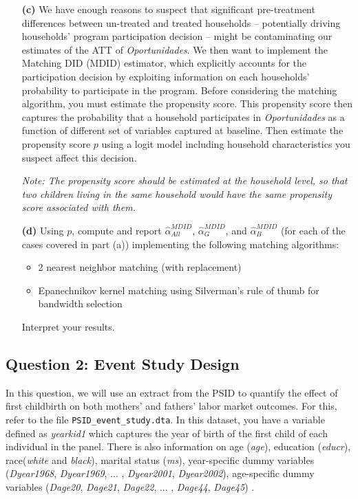 \documentclass[12pt]{article} %
\begin{document}
\begin{itemize}
\item[\textbf{(c)}] We have enough reasons to suspect that significant pre-treatment differences between un-treated and treated households -- potentially driving households' program participation decision -- might be contaminating our estimates of the ATT of \textit{Oportunidades}. We then want to implement the Matching DID (MDID) estimator, which explicitly accounts for the participation decision by exploiting information on each households' probability to participate in the program. Before considering the matching algorithm, you must estimate the propensity score. This propensity score then captures the probability that a household participates in \textit{Oportunidades} as a function of different set of variables captured at baseline. Then estimate the propensity score $p$ using a logit model including household characteristics you suspect affect this decision.

\textit{Note: The propensity score should be estimated at the household level, so that two children living in the same household would have the same propensity score associated with them.}\\

\item[\textbf{(d)}] Using $p$, compute and report $\widehat{\alpha}_{All}^{MDID}$, $\widehat{\alpha}_G^{MDID}$, and $\widehat{\alpha}_B^{MDID}$ (for each of the cases covered in part (a)) implementing the following matching algorithms:
	\begin{itemize}
		\item 2 nearest neighbor matching (with replacement)
		\item Epanechnikov kernel matching using Silverman's rule of thumb for bandwidth selection
	\end{itemize} 
	Interpret your results.\\

\end{itemize}


\subsection*{Question 2: Event Study Design}
In this question, we will use an extract from the PSID to quantify the effect of first childbirth on both mothers' and fathers' labor market outcomes. For this, refer to the file \texttt{PSID\_event\_study.dta}. In this dataset, you have a variable defined as \textit{yearkid1} which captures the year of birth of the first child of each individual in the panel. There is also information on age (\textit{age}), education (\textit{educr}), race(\textit{white} and \textit{black}), marital status (\textit{ms}), year-specific dummy variables (\textit{Dyear1968}, \textit{Dyear1969}, ... , \textit{Dyear2001}, \textit{Dyear2002}), age-specific dummy variables (\textit{Dage20}, \textit{Dage21}, \textit{Dage22}, ... , \textit{Dage44}, \textit{Dage45}) .\\
\end{document}
